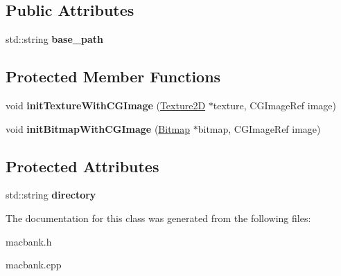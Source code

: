 \subsection*{Public Attributes}
\begin{DoxyCompactItemize}
\item 
\hypertarget{classg2c_1_1_mac_bank_a5467056dbe3fa7e7cd93970d198108fd}{
std::string {\bfseries base\_\-path}}
\label{classg2c_1_1_mac_bank_a5467056dbe3fa7e7cd93970d198108fd}

\end{DoxyCompactItemize}
\subsection*{Protected Member Functions}
\begin{DoxyCompactItemize}
\item 
\hypertarget{classg2c_1_1_mac_bank_a066c0d039d054b9f7bf652f20bce36b6}{
void {\bfseries initTextureWithCGImage} (\hyperlink{classg2c_1_1_texture2_d}{Texture2D} $\ast$texture, CGImageRef image)}
\label{classg2c_1_1_mac_bank_a066c0d039d054b9f7bf652f20bce36b6}

\item 
\hypertarget{classg2c_1_1_mac_bank_afc190c0f676881a3f09cd739ac899493}{
void {\bfseries initBitmapWithCGImage} (\hyperlink{classg2c_1_1_bitmap}{Bitmap} $\ast$bitmap, CGImageRef image)}
\label{classg2c_1_1_mac_bank_afc190c0f676881a3f09cd739ac899493}

\end{DoxyCompactItemize}
\subsection*{Protected Attributes}
\begin{DoxyCompactItemize}
\item 
\hypertarget{classg2c_1_1_mac_bank_aa0f97bf47c1c902c060893ec7fad8262}{
std::string {\bfseries directory}}
\label{classg2c_1_1_mac_bank_aa0f97bf47c1c902c060893ec7fad8262}

\end{DoxyCompactItemize}


The documentation for this class was generated from the following files:\begin{DoxyCompactItemize}
\item 
macbank.h\item 
macbank.cpp\end{DoxyCompactItemize}
